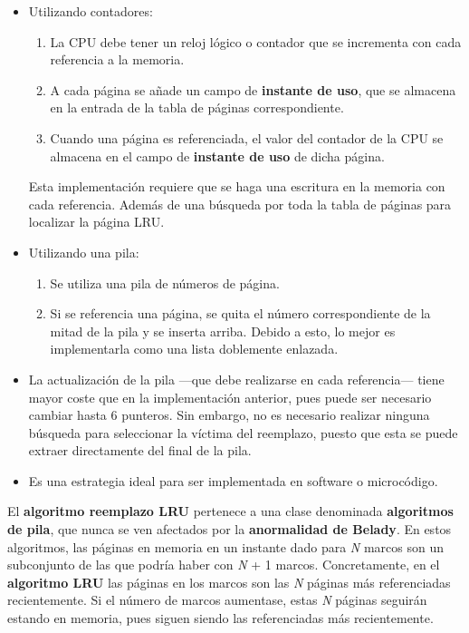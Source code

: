 \begin{itemize}
\item
  Utilizando contadores:

  \begin{enumerate}
  \def\labelenumi{\arabic{enumi}.}
  \item
    La CPU debe tener un reloj lógico o contador que se incrementa con
    cada referencia a la memoria.
  \item
    A cada página se añade un campo de \textbf{instante de uso}, que se
    almacena en la entrada de la tabla de páginas correspondiente.
  \item
    Cuando una página es referenciada, el valor del contador de la CPU
    se almacena en el campo de \textbf{instante de uso} de dicha página.
  \end{enumerate}

  Esta implementación requiere que se haga una escritura en la memoria
  con cada referencia. Además de una búsqueda por toda la tabla de
  páginas para localizar la página LRU.
\item
  Utilizando una pila:

  \begin{enumerate}
  \def\labelenumi{\arabic{enumi}.}
  \item
    Se utiliza una pila de números de página.
  \item
    Si se referencia una página, se quita el número correspondiente de
    la mitad de la pila y se inserta arriba. Debido a esto, lo mejor es
    implementarla como una lista doblemente enlazada.
  \end{enumerate}
\item
  La actualización de la pila ---que debe realizarse en cada
  referencia--- tiene mayor coste que en la implementación anterior,
  pues puede ser necesario cambiar hasta 6 punteros. Sin embargo, no es
  necesario realizar ninguna búsqueda para seleccionar la víctima del
  reemplazo, puesto que esta se puede extraer directamente del final de
  la pila.
\item
  Es una estrategia ideal para ser implementada en software o
  microcódigo.
\end{itemize}

El \textbf{algoritmo reemplazo LRU} pertenece a una clase denominada
\textbf{algoritmos de pila}, que nunca se ven afectados por la
\textbf{anormalidad de Belady}. En estos algoritmos, las páginas en
memoria en un instante dado para \emph{N} marcos son un subconjunto de
las que podría haber con \emph{N} + 1 marcos. Concretamente, en el
\textbf{algoritmo LRU} las páginas en los marcos son las \emph{N}
páginas más referenciadas recientemente. Si el número de marcos
aumentase, estas \emph{N} páginas seguirán estando en memoria, pues
siguen siendo las referenciadas más recientemente.

